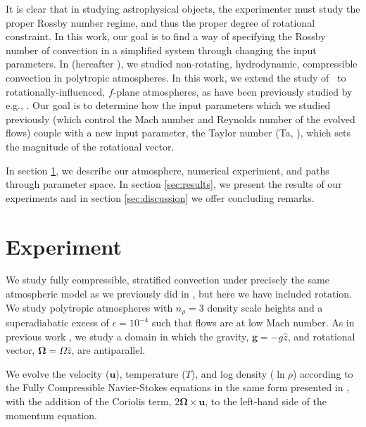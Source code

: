 \documentclass[twocolumn, amsmath, amsfonts, amssymb]{aastex62}
\begin{document}
It is clear that in studying astrophysical objects, the experimenter must 
study the proper Rossby number regime, and thus the proper degree of rotational
constraint.  In this work, our goal is to find a way of specifying the Rossby number
of convection in a simplified system through changing the input parameters.
In \cite{anders&brown2017} (hereafter \AB), we studied non-rotating, hydrodynamic, 
compressible convection in polytropic atmospheres. 
In this work, we extend the study of \AB$\,$ to rotationally-influenced, $f$-plane
atmospheres, as have been previously studied by e.g.,
\cite{brummell&all1996, brummell&all1998, calkins&all2015a}. Our goal is to determine
how the input parameters which we studied previously (which control the Mach number and
Reynolds number of the evolved flows) couple with a new input
parameter, the Taylor number (Ta, \cite{julien&all1996}), which sets the magnitude of the
rotational vector. 

In section  \ref{sec:experiment}, we describe our atmosphere, numerical
experiment, and paths through parameter space. In section \ref{sec:results}, we present
the results of our experiments and in section \ref{sec:discussion} we offer concluding remarks.

\section{Experiment} 
\label{sec:experiment}


We study fully compressible, stratified 
convection under precisely the same atmospheric model
as we previously did in \AB, but here
we have included rotation. We study polytropic atmospheres
with $n_\rho = 3$ density scale heights and a superadiabatic
excess of $\epsilon = 10^{-4}$ such that flows are at low Mach number.
As in previous work \citep{julien&all1996, brummell&all1996}, 
we study a domain in which the
gravity, $\bm{g} = -g\hat{z}$, and rotational vector, $\bm{\Omega} = \Omega \hat{z}$, 
are antiparallel.

We evolve the velocity ($\bm{u}$), temperature ($T$), and log density ($\ln\rho$) according to the
Fully Compressible Navier-Stokes equations in the same form presented in \AB, with the
addition of the Coriolis term, $2\bm{\Omega}\times\bm{u}$, to the left-hand side
of the momentum equation.
\end{document}
